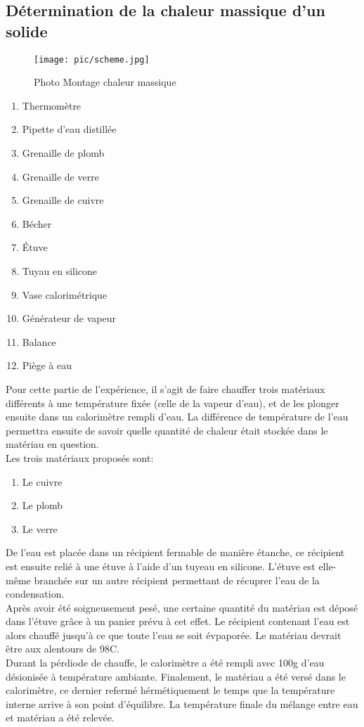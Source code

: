 \subsection{Détermination de la chaleur massique d'un solide}

\begin{figure}[!h]
    \centering
    \caption{Photo Montage chaleur massique}
    \texttt{[image: pic/scheme.jpg]}
\end{figure}
\begin{enumerate}
    \item{Thermomètre}
    \item{Pipette d'eau distillée}
    \item{Grenaille de plomb}
    \item{Grenaille de verre}
    \item{Grenaille de cuivre}
    \item{Bécher}
    \item{Étuve}
    \item{Tuyau en silicone}
    \item{Vase calorimétrique}
    \item{Générateur de vapeur}
    \item{Balance}
    \item{Piège à eau}
\end{enumerate}

Pour cette partie de l'expérience, il s'agit de faire chauffer trois matériaux différents à une température fixée (celle de la vapeur d'eau), et de les plonger ensuite dans un calorimètre rempli d'eau. La différence de température de l'eau permettra ensuite de savoir quelle quantité de chaleur était stockée dans le matériau en question.\\
Les trois matériaux proposés sont:
\begin{enumerate}
    \item{Le cuivre}
    \item{Le plomb}
    \item{Le verre}
\end{enumerate}
De l'eau est placée dans un récipient fermable de manière étanche, ce récipient est ensuite relié à une étuve à l'aide d'un tuyeau en silicone. L'étuve est elle-même branchée sur un autre récipient permettant de récuprer l'eau de la condensation.\\
Après avoir été soigneusement pesé, une certaine quantité du matériau est déposé dans l'étuve grâce à un panier prévu à cet effet. Le récipient contenant l'eau est alors chauffé jusqu'à ce que toute l'eau se soit évpaporée. Le matériau devrait être aux alentours de 98C\degree.\\
Durant la pérdiode de chauffe, le calorimètre a été rempli avec 100g d'eau désionisée à température ambiante.
Finalement, le matériau a été versé dans le calorimètre, ce dernier refermé hérmétiquement le temps que la température interne arrive à son point d'équilibre.
La température finale du mélange entre eau et matériau a été relevée.



